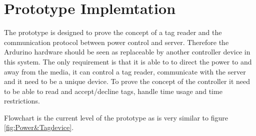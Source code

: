 \section{Prototype Implemtation}
The prototype is designed to prove the concept of a tag reader and the communication protocol between power control and server. Therefore  the Ardurino hardware should be seen as replaceable by another controller device in this system. The only requirement is that it is able to  to direct the power to and away from the media, it can control a tag reader, communicate with the server and it need to be a unique device. To prove the concept of the controller it need to be able to read and accept/decline tags, handle time usage and time restrictions. 


Flowchart is the current level of the prototype as is very similar to figure \ref{fig:Power&Tagdevice}.



    